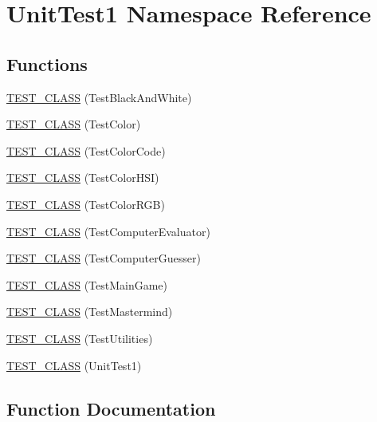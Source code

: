\hypertarget{namespace_unit_test1}{}\section{Unit\+Test1 Namespace Reference}
\label{namespace_unit_test1}
\subsection*{Functions}
\begin{DoxyCompactItemize}
\item 
\hyperlink{namespace_unit_test1_a8e0fb85865ea4559c8e46ba685e3a05c}{T\+E\+S\+T\+\_\+\+C\+L\+A\+SS} (Test\+Black\+And\+White)
\item 
\hyperlink{namespace_unit_test1_aa419db7c768dcb5d945a1d07d4e0fb30}{T\+E\+S\+T\+\_\+\+C\+L\+A\+SS} (Test\+Color)
\item 
\hyperlink{namespace_unit_test1_a288b4cd11e15db4ea6d87bbba9237858}{T\+E\+S\+T\+\_\+\+C\+L\+A\+SS} (Test\+Color\+Code)
\item 
\hyperlink{namespace_unit_test1_ac5fbfb9ad70c5a8635e98f0ab6a015a1}{T\+E\+S\+T\+\_\+\+C\+L\+A\+SS} (Test\+Color\+H\+SI)
\item 
\hyperlink{namespace_unit_test1_a704c0baddafb080ee836fba2de2c6354}{T\+E\+S\+T\+\_\+\+C\+L\+A\+SS} (Test\+Color\+R\+GB)
\item 
\hyperlink{namespace_unit_test1_a9de6dc6a7cd73dea67d8cc57aa018fd8}{T\+E\+S\+T\+\_\+\+C\+L\+A\+SS} (Test\+Computer\+Evaluator)
\item 
\hyperlink{namespace_unit_test1_a1591fd2592b729138d235f98f5b6b79f}{T\+E\+S\+T\+\_\+\+C\+L\+A\+SS} (Test\+Computer\+Guesser)
\item 
\hyperlink{namespace_unit_test1_ae5924d8a8ddbea2a349b10692c64e3e1}{T\+E\+S\+T\+\_\+\+C\+L\+A\+SS} (Test\+Main\+Game)
\item 
\hyperlink{namespace_unit_test1_a7ebc37dd289fa7eaf725d2a0e8deb453}{T\+E\+S\+T\+\_\+\+C\+L\+A\+SS} (Test\+Mastermind)
\item 
\hyperlink{namespace_unit_test1_a31d8bd76aeabc19fa0617d7a72d1d1d6}{T\+E\+S\+T\+\_\+\+C\+L\+A\+SS} (Test\+Utilities)
\item 
\hyperlink{namespace_unit_test1_a72947bdb044a2f5ee054fe1c31e79255}{T\+E\+S\+T\+\_\+\+C\+L\+A\+SS} (Unit\+Test1)
\end{DoxyCompactItemize}


\subsection{Function Documentation}
\hypertarget{namespace_unit_test1_ae5924d8a8ddbea2a349b10692c64e3e1}{}\label{namespace_unit_test1_ae5924d8a8ddbea2a349b10692c64e3e1} 
